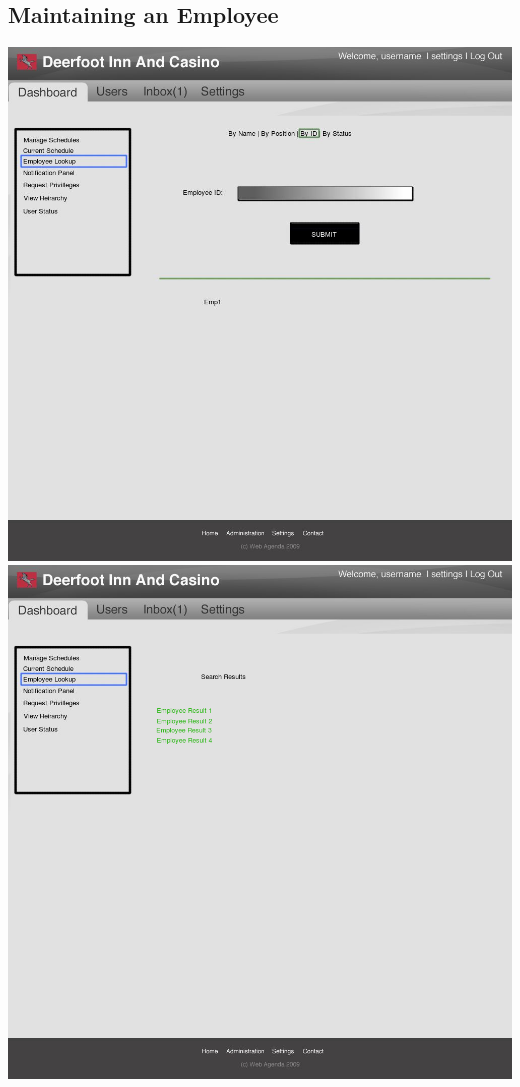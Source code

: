 \documentclass[letterpaper,12pt]{report}
\begin{document}
\begin{landscape}
\section{Maintaining an Employee}
\begin{center}
 \includegraphics[scale=0.3]{prototypes/Screen1.jpg}
 \includegraphics[scale=0.3]{prototypes/Screen3.png}
\end{center}


\end{landscape}
\end{document}
